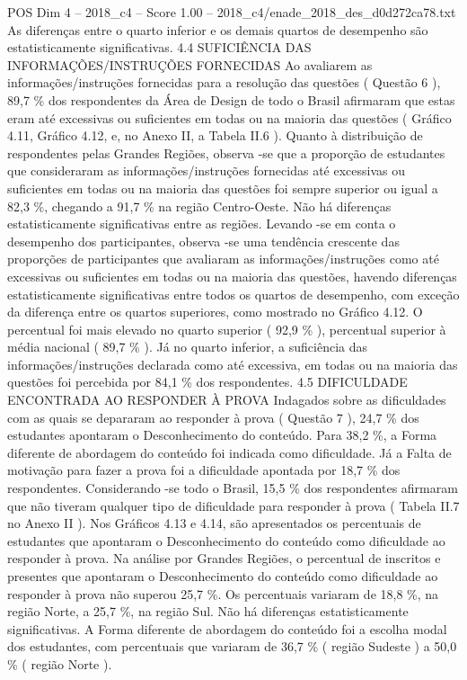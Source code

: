 \begin{textsample}{POS Dim 4 – 2018\_c4 – Score 1.00 – 2018\_c4/enade\_2018\_des\_d0d272ca78.txt}
As diferenças entre o quarto inferior e os demais quartos de desempenho são estatisticamente significativas. 4.4 SUFICIÊNCIA DAS INFORMAÇÕES/INSTRUÇÕES FORNECIDAS Ao avaliarem as informações/instruções fornecidas para a resolução das questões ( Questão 6 ), 89,7 \% dos respondentes da Área de Design de todo o Brasil afirmaram que estas eram até excessivas ou suficientes em todas ou na maioria das questões ( Gráfico 4.11, Gráfico 4.12, e, no Anexo II, a Tabela II.6 ).
Quanto à distribuição de respondentes pelas Grandes Regiões, observa -se que a proporção de estudantes que consideraram as informações/instruções fornecidas até excessivas ou suficientes em todas ou na maioria das questões foi sempre superior ou igual a 82,3 \%, chegando a 91,7 \% na região Centro-Oeste.
Não há diferenças estatisticamente significativas entre as regiões.
Levando -se em conta o desempenho dos participantes, observa -se uma tendência crescente das proporções de participantes que avaliaram as informações/instruções como até excessivas ou suficientes em todas ou na maioria das questões, havendo diferenças estatisticamente significativas entre todos os quartos de desempenho, com exceção da diferença entre os quartos superiores, como mostrado no Gráfico 4.12.
O percentual foi mais elevado no quarto superior ( 92,9 \% ), percentual superior à média nacional ( 89,7 \% ).
Já no quarto inferior, a suficiência das informações/instruções declarada como até excessiva, em todas ou na maioria das questões foi percebida por 84,1 \% dos respondentes. 4.5 DIFICULDADE ENCONTRADA AO RESPONDER À PROVA Indagados sobre as dificuldades com as quais se depararam ao responder à prova ( Questão 7 ), 24,7 \% dos estudantes apontaram o Desconhecimento do conteúdo.
Para 38,2 \%, a Forma diferente de abordagem do conteúdo foi indicada como dificuldade.
Já a Falta de motivação para fazer a prova foi a dificuldade apontada por 18,7 \% dos respondentes.
Considerando -se todo o Brasil, 15,5 \% dos respondentes afirmaram que não tiveram qualquer tipo de dificuldade para responder à prova ( Tabela II.7 no Anexo II ).
Nos Gráficos 4.13 e 4.14, são apresentados os percentuais de estudantes que apontaram o Desconhecimento do conteúdo como dificuldade ao responder à prova.
Na análise por Grandes Regiões, o percentual de inscritos e presentes que apontaram o Desconhecimento do conteúdo como dificuldade ao responder à prova não superou 25,7 \%.
Os percentuais variaram de 18,8 \%, na região Norte, a 25,7 \%, na região Sul.
Não há diferenças estatisticamente significativas.
A Forma diferente de abordagem do conteúdo foi a escolha modal dos estudantes, com percentuais que variaram de 36,7 \% ( região Sudeste ) a 50,0 \% ( região Norte ).

\end{textsample}
